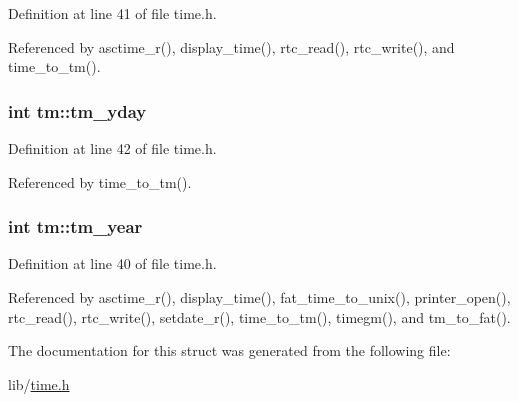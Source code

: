 Definition at line 41 of file time.\-h.



Referenced by asctime\-\_\-r(), display\-\_\-time(), rtc\-\_\-read(), rtc\-\_\-write(), and time\-\_\-to\-\_\-tm().

\hypertarget{structtm_a93a0ba77cc23796df84405dcbcc57eb1}{
\subsubsection[{tm\-\_\-yday}]{\setlength{\rightskip}{0pt plus 5cm}int tm\-::tm\-\_\-yday}}\label{structtm_a93a0ba77cc23796df84405dcbcc57eb1}


Definition at line 42 of file time.\-h.



Referenced by time\-\_\-to\-\_\-tm().

\hypertarget{structtm_a33adf78fd6476b2120ce3b9c4a852053}{
\subsubsection[{tm\-\_\-year}]{\setlength{\rightskip}{0pt plus 5cm}int tm\-::tm\-\_\-year}}\label{structtm_a33adf78fd6476b2120ce3b9c4a852053}


Definition at line 40 of file time.\-h.



Referenced by asctime\-\_\-r(), display\-\_\-time(), fat\-\_\-time\-\_\-to\-\_\-unix(), printer\-\_\-open(), rtc\-\_\-read(), rtc\-\_\-write(), setdate\-\_\-r(), time\-\_\-to\-\_\-tm(), timegm(), and tm\-\_\-to\-\_\-fat().



The documentation for this struct was generated from the following file\-:\begin{DoxyCompactItemize}
\item 
lib/\hyperlink{time_8h}{time.\-h}\end{DoxyCompactItemize}
